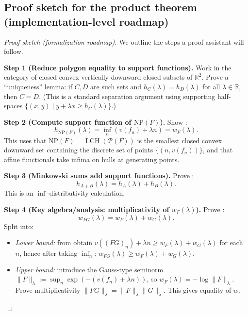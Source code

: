 \subsection{Proof sketch for the product theorem (implementation-level roadmap)}

\begin{proof}[Proof sketch (formalization roadmap)]
  \label{proof:sketch_newton_polygon_mul}
  \leanok
  We outline the steps a proof assistant will follow.

  \textbf{Step 1 (Reduce polygon equality to support functions).}
  Work in the category of closed convex vertically downward closed subsets of $\mathbb{R}^2$.
  Prove a “uniqueness” lemma: if $C,D$ are such sets and $h_C(\lambda)=h_D(\lambda)$ for all $\lambda\in\mathbb{R}$,
  then $C=D$. (This is a standard separation argument using supporting half-spaces
  $\{(x,y)\mid y+\lambda x\ge h_C(\lambda)\}$.)

  \textbf{Step 2 (Compute support function of $\mathrm{NP}(F)$).}
  Show :
  \[
    h_{\mathrm{NP}(F)}(\lambda)=\inf_n (v(f_n)+\lambda n)=w_F(\lambda).
  \]
  This uses that $\mathrm{NP}(F)=\operatorname{LCH}(\mathcal{P}(F))$ is the smallest closed convex downward set containing
  the discrete set of points $\{(n,v(f_n))\}$, and that affine functionals take infima on hulls at generating points.

  \textbf{Step 3 (Minkowski sums add support functions).}
  Prove :
  \[
    h_{A+B}(\lambda)=h_A(\lambda)+h_B(\lambda).
  \]
  This is an $\inf$-distributivity calculation.

  \textbf{Step 4 (Key algebra/analysis: multiplicativity of $w_F(\lambda)$).}
  Prove :
  \[
    w_{FG}(\lambda)=w_F(\lambda)+w_G(\lambda).
  \]
  Split into:
  \begin{itemize}
    \item \emph{Lower bound:} from  obtain
      $v((FG)_n)+\lambda n\ge w_F(\lambda)+w_G(\lambda)$ for each $n$, hence after taking $\inf_n$:
      $w_{FG}(\lambda)\ge w_F(\lambda)+w_G(\lambda)$.
    \item \emph{Upper bound:} introduce the Gauss-type seminorm $\|F\|_\lambda := \sup_n \exp(-(v(f_n)+\lambda n))$,
      so $w_F(\lambda)=-\log\|F\|_\lambda$. Prove multiplicativity $\|FG\|_\lambda=\|F\|_\lambda\|G\|_\lambda$.
      This gives equality of $w$.
  \end{itemize}


\end{proof}

